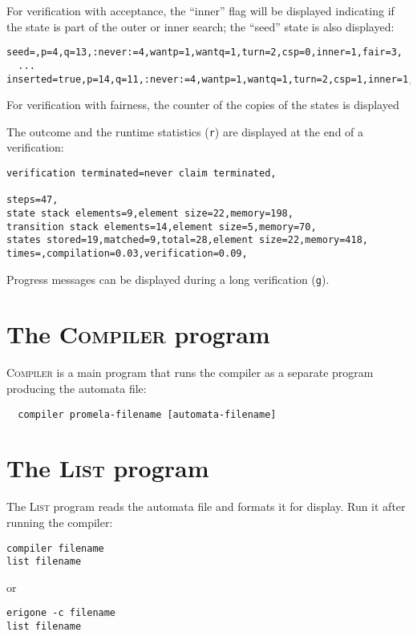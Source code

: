 \documentclass[11pt]{article}
\newcommand*{\lst}{\textsc{List}}
\newcommand*{\cmp}{\textsc{Compiler}}
\newcommand*{\p}[1]{\texttt{#1}}
\begin{document}
For verification with acceptance, the ``inner'' flag will be displayed
indicating if the state is part of the outer or inner search; the
``seed'' state is also displayed:

\begin{footnotesize}
\begin{verbatim}
seed=,p=4,q=13,:never:=4,wantp=1,wantq=1,turn=2,csp=0,inner=1,fair=3,
  ...
inserted=true,p=14,q=11,:never:=4,wantp=1,wantq=1,turn=2,csp=1,inner=1,fair=1,
\end{verbatim}
\end{footnotesize}

For verification with fairness, the counter of the copies of the states
is displayed

The outcome and the runtime statistics (\p{r}) are
displayed at the end of a verification:

\begin{footnotesize}
\begin{verbatim}
verification terminated=never claim terminated,

steps=47,
state stack elements=9,element size=22,memory=198,
transition stack elements=14,element size=5,memory=70,
states stored=19,matched=9,total=28,element size=22,memory=418,
times=,compilation=0.03,verification=0.09,
\end{verbatim}
\end{footnotesize}

Progress messages can be displayed during a long verification (\p{g}).

\newpage

\section{The \cmp{} program}\label{s.compile}

\cmp{} is a main program that runs the compiler as a separate program
producing the automata file:
\begin{verbatim}
  compiler promela-filename [automata-filename]
\end{verbatim}


\section{The \lst{} program}\label{s.lst}

The \lst{} program reads the automata file and formats it for display.
Run it after running the compiler:
\begin{verbatim}
compiler filename
list filename
\end{verbatim}
or
\begin{verbatim}
erigone -c filename
list filename
\end{verbatim}
\end{document}

